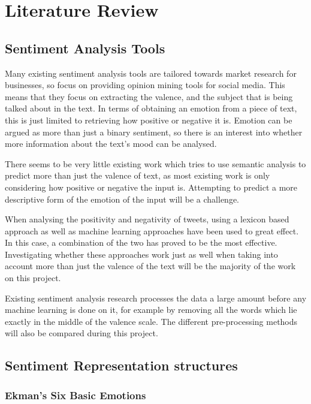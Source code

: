 
\section{Literature Review}
\subsection{Sentiment Analysis Tools}


Many existing sentiment analysis tools are tailored towards market research for businesses, so focus on providing opinion mining tools for social media. This means that they focus on extracting the valence, and the subject that is being talked about in the text. In terms of obtaining an emotion from a piece of text, this is just limited to retrieving how positive or negative it is. Emotion can be argued as more than just a binary sentiment, so there is an interest into whether more information about the text's mood can be analysed. 

There seems to be very little existing work which tries to use semantic analysis to predict more than just the valence of text, as most existing work is only considering how positive or negative the input is. Attempting to predict a more descriptive form of the emotion of the input will be a challenge.

When analysing the positivity and negativity of tweets, using a lexicon based approach as well as machine learning approaches have been used \cite{kolchyna2015twitter} to great effect. In this case, a combination of the two has proved to be the most effective. Investigating whether these approaches work just as well when taking into account more than just the valence of the text will be the majority of the work on this project. 

Existing sentiment analysis research processes the data a large amount before any machine learning is done on it, for example by removing all the words which lie exactly in the middle of the valence scale.  \cite{kolchyna2015twitter} The different pre-processing methods will also be compared during this project.


\subsection{Sentiment Representation structures}

\subsubsection{Ekman's Six Basic Emotions}

